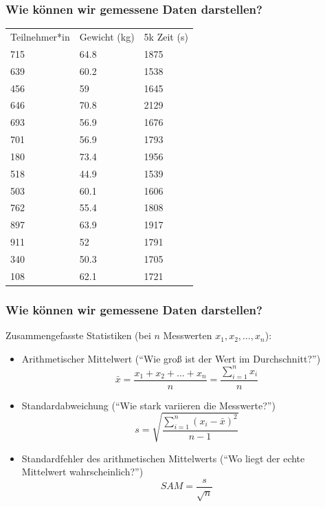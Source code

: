 \documentclass{beamer}
\begin{document}
\begin{frame}

\frametitle{Wie können wir gemessene Daten darstellen?}


\begin{tabular}{lll}
Teilnehmer*in   & Gewicht (kg)  &  5k Zeit (s)  \\
715 &	64.8 &	1875  \\
639 &	60.2 &	1538 \\
456 &	59 &	1645 \\
646 &	70.8 &	2129 \\
693 &	56.9 &	1676 \\
701 &	56.9 &	1793 \\
180 &	73.4 &	1956 \\
518 &	44.9 &	1539 \\
503 &	60.1 &	1606 \\
762 &	55.4 &	1808 \\
897 &	63.9 &	1917 \\
911 &	52 &	1791 \\
340 &	50.3 &	1705 \\
108 &	62.1 &	1721 \\
\end{tabular}



\end{frame}


\begin{frame}
\frametitle{Wie können wir gemessene Daten darstellen?}

Zusammengefasste Statistiken (bei \(n\) Messwerten \(x_1, x_2, \dots, x_n\)):

\begin{itemize}
\item
Arithmetischer Mittelwert (``Wie groß ist der Wert im Durchschnitt?'')
\[
\bar{x} =  \frac{x_1 + x_2 + \dots + x_n}{n} = \frac{\sum_{i=1}^n x_i}{n}
\]
\pause
\item
Standardabweichung (``Wie stark variieren die Messwerte?'')
\[
s = \sqrt{\frac{\sum_{i=1}^n (x_i-\bar{x})^2}{n-1}}
\]
\pause
\item
Standardfehler des arithmetischen Mittelwerts (``Wo liegt der echte Mittelwert wahrscheinlich?'')
\[
SAM = \frac{s}{\sqrt{n}}
\]
\end{itemize}


\end{frame}
\end{document}
